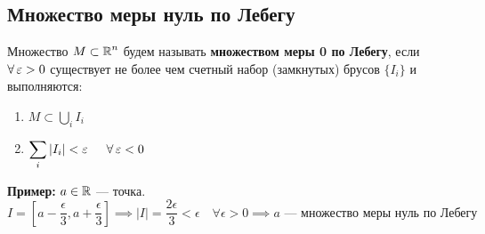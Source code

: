 \subsection{Множество меры нуль по Лебегу}

 Множество $M\subset\operatorname{\mathbb{R}}^n$ будем называть \textbf{множеством меры 0 по Лебегу}, если $\forall\operatorname{\varepsilon}>0$ существует не более чем счетный набор (замкнутых) брусов $\{I_i\}$ и выполняются:
\begin{enumerate}[label=\textbullet]
    \item $M\subset \displaystyle\bigcup_iI_i$
    \item $\displaystyle\sum_i|I_i| < \ve\,\, \quad \forall \ve < 0$
\end{enumerate}

\textbf{Пример:} $a \in \operatorname{\mathbb{R}}$  --- точка.
\begin{equation}
    I = [a - \frac{\epsilon}{3}, a + \frac{\epsilon}{3}] \implies |I| = \frac{2 \epsilon}{3} < \epsilon \quad \forall \epsilon > 0 \implies a \text{ --- множество меры нуль по Лебегу}
\end{equation}



